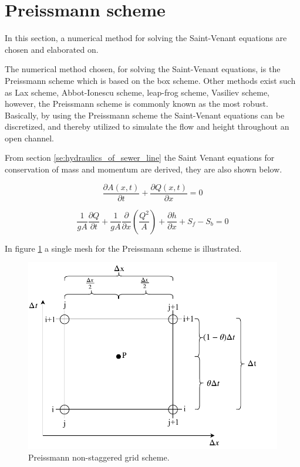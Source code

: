 ﻿\section{Preissmann scheme}\label{se:preissmann_scheme}
In this section, a numerical method for solving the Saint-Venant equations are chosen and elaborated on.


The numerical method chosen, for solving the Saint-Venant equations,%
is the Preissmann scheme which is based on the box scheme. Other methods exist such as Lax scheme, Abbot-Ionescu scheme, leap-frog scheme, Vasiliev scheme, however, the Preissmann scheme is commonly known as the most robust. Basically, by using the Preissmann scheme the Saint-Venant equations can be discretized, and thereby utilized to simulate the flow and height throughout an open channel.

From section \ref{se:hydraulics_of_sewer_line} the Saint Venant equations for conservation of mass and momentum are derived, they are also shown below.

\begin{equation}\label{eq:saintbernard_mass_preiss}
\frac{\partial A(x,t)}{\partial t} + \frac{\partial Q(x,t)}{\partial x}=0
\end{equation}

\begin{equation}\label{eq:saintbernard_momentum_preiss}
\frac{1}{gA} \frac{\partial Q}{\partial t} +\frac{1}{gA}\frac{\partial}{\partial x} \left( \frac{Q^2}{A} \right) + \frac{\partial h}{\partial x} + S_f - S_b = 0
\end{equation}


In figure \ref{fig:preissmann_grid_scheme} a single mesh for the Preissmann scheme is illustrated.

\begin{figure}[H]
\centering
%
\includegraphics[width=.8\textwidth]{report/simulation/pictures/preissmann_scheme.pdf}
\caption{Preissmann non-staggered grid scheme.}
\label{fig:preissmann_grid_scheme}
\end{figure}

